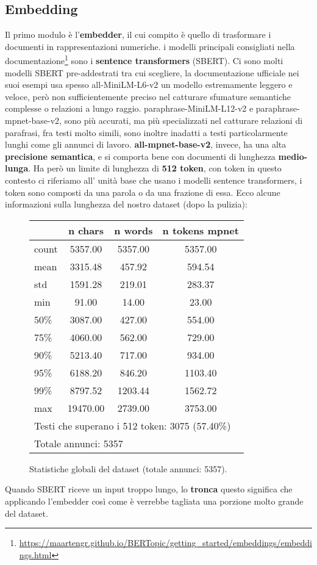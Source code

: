 \subsection{Embedding}
Il primo modulo è l'\textbf{embedder}, il cui compito è quello di trasformare i documenti in rappresentazioni numeriche.
i modelli principali consigliati nella documentazione\footnote{\url{https://maartengr.github.io/BERTopic/getting_started/embeddings/embeddings.html}} sono i \textbf{sentence transformers} (SBERT).
Ci sono molti modelli SBERT pre-addestrati tra cui scegliere, la documentazione ufficiale nei suoi esempi usa spesso all-MiniLM-L6-v2 un modello estremamente leggero e veloce, però non sufficientemente preciso nel catturare sfumature semantiche complesse o relazioni a lungo raggio.
paraphrase-MiniLM-L12-v2 e paraphrase-mpnet-base-v2, sono più accurati, ma più specializzati nel catturare relazioni di parafrasi, fra testi molto simili, sono inoltre inadatti a testi particolarmente lunghi come gli annunci di lavoro.
\textbf{all-mpnet-base-v2}, invece, ha una alta \textbf{precisione semantica}, e si comporta bene con documenti di lunghezza \textbf{medio-lunga}.
Ha però un limite di lunghezza di \textbf{512 token}, con token in questo contesto ci riferiamo all' unità base che usano i modelli sentence transformers, i token sono composti da una parola o da una frazione di essa.
Ecco alcune informazioni sulla lunghezza del nostro dataset (dopo la pulizia):
\begin{figure}[H]
\centering
\scriptsize
\begin{tabular}{lccc}
\hline
 & n chars & n words & n tokens mpnet \\
\hline
count & 5357.00 & 5357.00 & 5357.00 \\
mean & 3315.48 & 457.92 & 594.54 \\
std & 1591.28 & 219.01 & 283.37 \\
min & 91.00 & 14.00 & 23.00 \\
50\% & 3087.00 & 427.00 & 554.00 \\
75\% & 4060.00 & 562.00 & 729.00 \\
90\% & 5213.40 & 717.00 & 934.00 \\
95\% & 6188.20 & 846.20 & 1103.40 \\
99\% & 8797.52 & 1203.44 & 1562.72 \\
max & 19470.00 & 2739.00 & 3753.00 \\
\hline
\multicolumn{4}{l}{Testi che superano i 512 token: 3075 (57.40\%)} \\
\multicolumn{4}{l}{Totale annunci: 5357} \\
\hline
\end{tabular}
\caption{Statistiche globali del dataset (totale annunci: 5357).}
\label{fig:dataset-stats}
\end{figure}
\noindent Quando SBERT riceve un input troppo lungo, lo \textbf{tronca} questo significa che applicando l'embedder così come è verrebbe tagliata una porzione molto grande del dataset.

